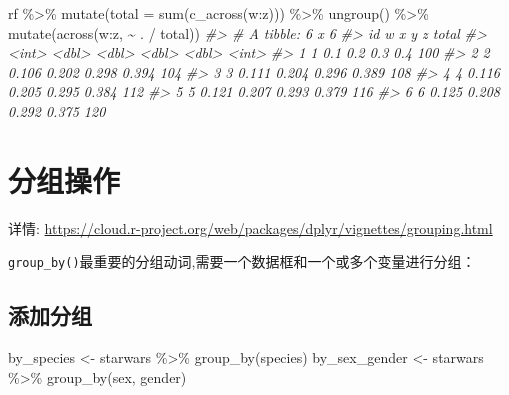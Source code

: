 \documentclass[
]{book}
\newenvironment{Shaded}{\begin{snugshade}}{\end{snugshade}}
\newcommand{\AttributeTok}[1]{\textcolor[rgb]{0.77,0.63,0.00}{#1}}
\newcommand{\CommentTok}[1]{\textcolor[rgb]{0.56,0.35,0.01}{\textit{#1}}}
\newcommand{\FunctionTok}[1]{\textcolor[rgb]{0.00,0.00,0.00}{#1}}
\newcommand{\NormalTok}[1]{#1}
\newcommand{\OtherTok}[1]{\textcolor[rgb]{0.56,0.35,0.01}{#1}}
\newcommand{\SpecialCharTok}[1]{\textcolor[rgb]{0.00,0.00,0.00}{#1}}
\begin{document}
\begin{Shaded}
\begin{Highlighting}[]
\NormalTok{rf }\SpecialCharTok{\%\textgreater{}\%} 
  \FunctionTok{mutate}\NormalTok{(}\AttributeTok{total =} \FunctionTok{sum}\NormalTok{(}\FunctionTok{c\_across}\NormalTok{(w}\SpecialCharTok{:}\NormalTok{z))) }\SpecialCharTok{\%\textgreater{}\%} 
  \FunctionTok{ungroup}\NormalTok{() }\SpecialCharTok{\%\textgreater{}\%} 
  \FunctionTok{mutate}\NormalTok{(}\FunctionTok{across}\NormalTok{(w}\SpecialCharTok{:}\NormalTok{z, }\SpecialCharTok{\textasciitilde{}}\NormalTok{ . }\SpecialCharTok{/}\NormalTok{ total))}
\CommentTok{\#\textgreater{} \# A tibble: 6 x 6}
\CommentTok{\#\textgreater{}      id     w     x     y     z total}
\CommentTok{\#\textgreater{}   \textless{}int\textgreater{} \textless{}dbl\textgreater{} \textless{}dbl\textgreater{} \textless{}dbl\textgreater{} \textless{}dbl\textgreater{} \textless{}int\textgreater{}}
\CommentTok{\#\textgreater{} 1     1 0.1   0.2   0.3   0.4     100}
\CommentTok{\#\textgreater{} 2     2 0.106 0.202 0.298 0.394   104}
\CommentTok{\#\textgreater{} 3     3 0.111 0.204 0.296 0.389   108}
\CommentTok{\#\textgreater{} 4     4 0.116 0.205 0.295 0.384   112}
\CommentTok{\#\textgreater{} 5     5 0.121 0.207 0.293 0.379   116}
\CommentTok{\#\textgreater{} 6     6 0.125 0.208 0.292 0.375   120}
\end{Highlighting}
\end{Shaded}

\hypertarget{dplyr-groupby-manipulation}{%
\section{分组操作}\label{dplyr-groupby-manipulation}}

详情: \url{https://cloud.r-project.org/web/packages/dplyr/vignettes/grouping.html}

\texttt{group\_by()}最重要的分组动词,需要一个数据框和一个或多个变量进行分组：

\hypertarget{ux6dfbux52a0ux5206ux7ec4}{%
\subsection{添加分组}\label{ux6dfbux52a0ux5206ux7ec4}}

\begin{Shaded}
\begin{Highlighting}[]
\NormalTok{by\_species }\OtherTok{\textless{}{-}}\NormalTok{ starwars }\SpecialCharTok{\%\textgreater{}\%} \FunctionTok{group\_by}\NormalTok{(species)}
\NormalTok{by\_sex\_gender }\OtherTok{\textless{}{-}}\NormalTok{ starwars }\SpecialCharTok{\%\textgreater{}\%} \FunctionTok{group\_by}\NormalTok{(sex, gender)}
\end{Highlighting}
\end{Shaded}
\end{document}
